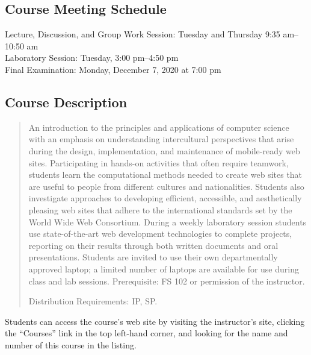 \documentclass[11pt]{article}
\begin{document}
\vspace*{-.1in}

\subsection*{Course Meeting Schedule}

Lecture, Discussion, and Group Work Session: Tuesday and Thursday 9:35 am--10:50 am \\
Laboratory Session: Tuesday, 3:00 pm--4:50 pm \\
Final Examination: Monday, December 7, 2020 at 7:00 pm

\vspace*{-.1in}

\subsection*{Course Description}

\begin{quote}

An introduction to the principles and applications of computer science with an
emphasis on understanding intercultural perspectives that arise during the
design, implementation, and maintenance of mobile-ready web sites. Participating
in hands-on activities that often require teamwork, students learn the
computational methods needed to create web sites that are useful to people from
different cultures and nationalities. Students also investigate approaches to
developing efficient, accessible, and aesthetically pleasing web sites that
adhere to the international standards set by the World Wide Web Consortium.
During a weekly laboratory session students use state-of-the-art web development
technologies to complete projects, reporting on their results through both
written documents and oral presentations. Students are invited to use their own
departmentally approved laptop; a limited number of laptops are available for
use during class and lab sessions. Prerequisite: FS 102 or permission of the
instructor.

Distribution Requirements: IP, SP. \@ \\

\end{quote}

\noindent Students can access the course's web site by visiting the instructor's
site, clicking the ``Courses'' link in the top left-hand corner, and looking for
the name and number of this course in the listing.
\end{document}
